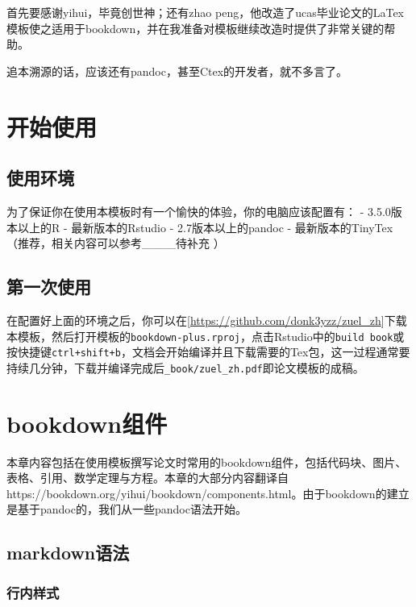 \documentclass[singlesided]{Style/ucasthesis}%
\begin{document}
首先要感谢yihui，毕竟创世神；还有zhao peng，他改造了ucas毕业论文的LaTex模板使之适用于bookdown，并在我准备对模板继续改造时提供了非常关键的帮助。

追本溯源的话，应该还有pandoc，甚至Ctex的开发者，就不多言了。

\hypertarget{start}{%
\chapter{开始使用}\label{start}}

\hypertarget{section}{%
\section{使用环境}\label{section}}

为了保证你在使用本模板时有一个愉快的体验，你的电脑应该配置有：
- 3.5.0版本以上的R
- 最新版本的Rstudio
- 2.7版本以上的pandoc
- 最新版本的TinyTex（推荐，相关内容可以参考\_\_\_\_待补充 ）

\hypertarget{first-use}{%
\section{第一次使用}\label{first-use}}

在配置好上面的环境之后，你可以在{[}\url{https://github.com/donk3yzz/zuel_zh}{]}下载本模板，然后打开模板的\texttt{bookdown-plus.rproj}，点击Rstudio中的\texttt{build\ book}或按快捷键\texttt{ctrl+shift+b}，文档会开始编译并且下载需要的Tex包，这一过程通常要持续几分钟，下载并编译完成后\texttt{\_book/zuel\_zh.pdf}即论文模板的成稿。

\hypertarget{bookdown}{%
\chapter{bookdown组件}\label{bookdown}}

本章内容包括在使用模板撰写论文时常用的bookdown组件，包括代码块、图片、表格、引用、数学定理与方程。本章的大部分内容翻译自https://bookdown.org/yihui/bookdown/components.html。由于bookdown的建立是基于pandoc的，我们从一些pandoc语法开始。

\hypertarget{markdown}{%
\section{markdown语法}\label{markdown}}

\hypertarget{section-1}{%
\subsection{行内样式}\label{section-1}}
\end{document}
